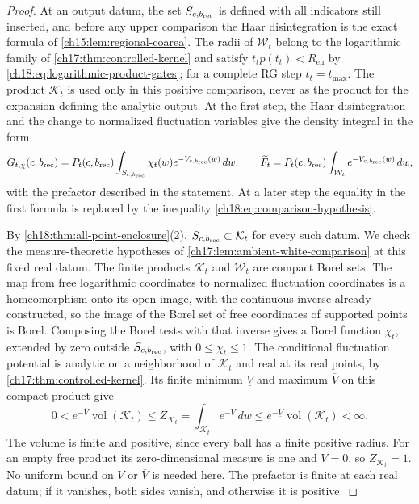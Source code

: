 \begin{proof}
At an output datum, the set $S_{c,b_{\mathrm{rec}}}$ is defined with all indicators still inserted, and before any upper comparison the Haar disintegration is the exact formula of \cref{ch15:lem:regional-coarea}. The radii of $\mathcal W_t$ belong to the logarithmic family of \cref{ch17:thm:controlled-kernel} and satisfy $t_tp(t_t)<R_{\mathrm{en}}$ by \eqref{ch18:eq:logarithmic-product-gates}; for a complete RG step $t_t=t_{\max}$. The product $\mathcal K_t$ is used only in this positive comparison, never as the product for the expansion defining the analytic output. At the first step, the Haar disintegration and the change to normalized fluctuation variables give the density integral in the form
\begin{equation}\label{ch18:eq:same-prefactor}
 G_{t,\chi}(c,b_{\mathrm{rec}})
  =P_t(c,b_{\mathrm{rec}})\int_{S_{c,b_{\mathrm{rec}}}}\chi_t(w)e^{-V_{c,b_{\mathrm{rec}}}(w)}\,dw,
 \qquad
 \widetilde F_t=P_t(c,b_{\mathrm{rec}})
                 \int_{\mathcal W_t}e^{-V_{c,b_{\mathrm{rec}}}(w)}\,dw,
\end{equation}
with the prefactor described in the statement. At a later step the equality in the first formula is replaced by the inequality \eqref{ch18:eq:comparison-hypothesis}.

By \cref{ch18:thm:all-point-enclosure}(2), $S_{c,b_{\mathrm{rec}}}\subset\mathcal K_t$ for every such datum. We check the measure-theoretic hypotheses of \cref{ch17:lem:ambient-white-comparison} at this fixed real datum. The finite products $\mathcal K_t$ and $\mathcal W_t$ are compact Borel sets. The map from free logarithmic coordinates to normalized fluctuation coordinates is a homeomorphism onto its open image, with the continuous inverse already constructed, so the image of the Borel set of free coordinates of supported points is Borel. Composing the Borel tests with that inverse gives a Borel function $\chi_t$, extended by zero outside $S_{c,b_{\mathrm{rec}}}$, with $0\le\chi_t\le1$. The conditional fluctuation potential is analytic on a neighborhood of $\mathcal K_t$ and real at its real points, by \cref{ch17:thm:controlled-kernel}. Its finite minimum $\underline V$ and maximum $\overline V$ on this compact product give
\begin{equation}\label{ch18:eq:ambient-finite-normalizer}
 0<e^{-\overline V}\operatorname{vol}(\mathcal K_t)
 \le Z_{\mathcal K_t}=\int_{\mathcal K_t}e^{-V}\,dw
 \le e^{-\underline V}\operatorname{vol}(\mathcal K_t)<\infty.
\end{equation}
The volume is finite and positive, since every ball has a finite positive radius. For an empty free product its zero-dimensional measure is one and $V=0$, so $Z_{\mathcal K_t}=1$. No uniform bound on $\underline V$ or $\overline V$ is needed here. The prefactor is finite at each real datum; if it vanishes, both sides vanish, and otherwise it is positive.


\end{proof}
